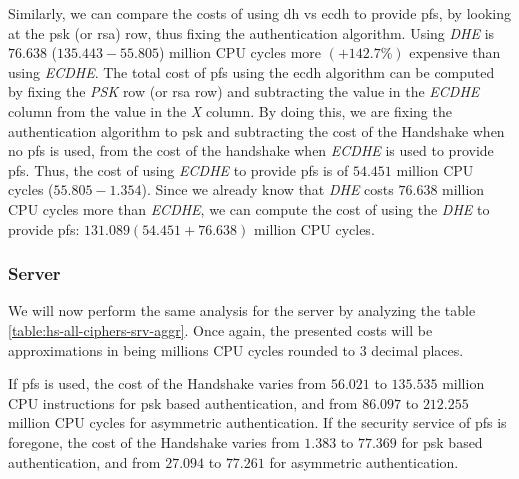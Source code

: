 \documentclass{llncs}
\begin{document}
Similarly, we can compare the costs of using \gls{dh} vs \gls{ecdh} to provide \gls{pfs}, by
looking at the \gls{psk} (or \gls{rsa}) row, thus fixing the authentication algorithm. Using \textit{DHE} is
$76.638$ ($135.443 - 55.805$) million CPU cycles more $(+142.7\%)$ expensive than using \textit{ECDHE}.
The total cost of \gls{pfs}
using the \gls{ecdh} algorithm can be computed by fixing the \textit{PSK} row (or \gls{rsa} row)
and subtracting the value in the \textit{ECDHE} column from the value in the \textit{X} column. By doing this, we are
fixing the authentication algorithm to \gls{psk} and subtracting the cost of the Handshake when no \gls{pfs} is used,
from the cost of the handshake when \textit{ECDHE} is used to provide \gls{pfs}. Thus, the cost of using \textit{ECDHE}
to provide \gls{pfs} is of $54.451$ million CPU cycles ($55.805-1.354$). Since we already know that \textit{DHE} costs
$76.638$ million CPU cycles more than \textit{ECDHE}, we can compute the cost of using the \textit{DHE} to
provide \gls{pfs}: $131.089 (54.451+76.638)$ million CPU cycles.

\subsubsection{Server}

We will now perform the same analysis for the server by analyzing the table \ref{table:hs-all-ciphers-srv-aggr}. 
Once again, the presented costs will be approximations in
being millions CPU cycles rounded to $3$ decimal places.

If \gls{pfs} is used, the cost of the Handshake varies from $56.021$ to $135.535$
million CPU instructions for \gls{psk} based authentication, and from $86.097$ to $212.255$ million CPU cycles for
asymmetric authentication. If the security service of \gls{pfs} is foregone, the cost
of the Handshake varies from $1.383$  to $77.369$ for \gls{psk} based authentication,
and from $27.094$ to $77.261$ for asymmetric authentication.
\end{document}

